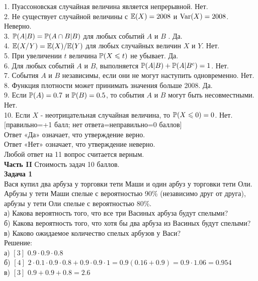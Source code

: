 \documentclass[12pt, a4paper]{article}\usepackage[]{graphicx}\usepackage[]{color}
\begin{document}
1. Пуассоновская случайная величина является непрерывной. Нет. \\
2. Не существует случайной величины с $\E(X)=2008$ и $\Var(X)=2008$. Неверно. \\
3. $\P(A|B)=\P(A\cap B|B)$ для любых событий $A$ и $B$ . Да. \\
4. $\E(X/Y)=\E(X)/\E(Y)$ для любых случайных величин $X$ и $Y$. Нет. \\
5. При увеличении $t$ величина $\P(X\le t)$ не убывает. Да. \\
6. Для любых событий $A$ и $B$, выполняется $\P(A|B)+\P(A|B^{c})=1$. Нет. \\
7. События $A$ и $B$ независимы, если они не могут наступить одновременно. Нет. \\
8. Функция плотности может принимать значения больше 2008. Да. \\
9. Если $\P(A)=0.7$ и $\P(B)=0.5$, то события $A$ и $B$ могут быть несовместными. Нет. \\
10. Если $X$ - неотрицательная случайная величина, то $\P(X\le 0)=0$. Нет. \\

$[$правильно=+1 балл; нет ответа=неправильно=0 баллов$]$ \\
Ответ «Да» означает, что утверждение верно. \\
Ответ «Нет» означает, что утверждение неверно. \\
Любой ответ на 11 вопрос считается верным. \\


\textbf{Часть II} Стоимость задач 10 баллов. \\





\textbf{Задача 1} \\ %
Вася купил два арбуза у торговки тети Маши и один арбуз у торговки тети Оли. Арбузы у тети Маши спелые с вероятностью 90\% (независимо друг от друга), арбузы у тети Оли спелые с вероятностью 80\%. \\
а) Какова вероятность того, что все три Васиных арбуза будут спелыми? \\
б) Какова вероятность того, что хотя бы два арбуза из Васиных будут спелыми? \\
в) Каково ожидаемое количество спелых арбузов у Васи? \\
Решение: \\
а) $[3]$ $0.9\cdot 0.9\cdot 0.8$ \\
б) $[4]$ $2\cdot 0.1\cdot 0.9\cdot 0.8+0.9\cdot 0.9\cdot 1=0.9(0.16+0.9)=0.9\cdot 1.06=0.954$ \\
в) $[3]$ $0.9+0.9+0.8=2.6$ \\
\end{document}
